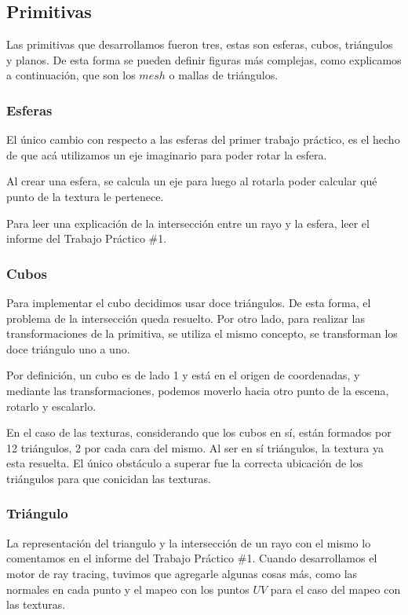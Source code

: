 \documentclass[a4paper,10pt]{article}
\begin{document}
\subsection{Primitivas}

Las primitivas que desarrollamos fueron tres, estas son esferas, cubos,
tri\'angulos y planos.  De esta forma se pueden definir figuras m\'as
complejas, como explicamos a continuaci\'on, que son los $mesh$ o mallas de
tri\'angulos.

\subsubsection{Esferas}

El \'unico cambio con respecto a las esferas del primer trabajo pr\'actico, es
el hecho de que ac\'a utilizamos un eje imaginario para poder rotar la esfera.

Al crear una esfera, se calcula un eje para luego al rotarla poder calcular
qu\'e punto de la textura le pertenece.

Para leer una explicaci\'on de la intersecci\'on entre un rayo y la esfera,
leer el informe del Trabajo Pr\'actico \#1.

\subsubsection{Cubos}

Para implementar el cubo decidimos usar doce tri\'angulos.  De esta forma, el
problema de la intersecci\'on queda resuelto.  Por otro lado, para realizar las
transformaciones de la primitiva, se utiliza el mismo concepto, se transforman
los doce tri\'angulo uno a uno.

Por definici\'on, un cubo es de lado 1 y est\'a en el origen de coordenadas, y
mediante las transformaciones, podemos moverlo hacia otro punto de la escena, 
rotarlo y escalarlo.

En el caso de las texturas, considerando que los cubos en s\'i, est\'an
formados por 12 tri\'angulos, 2 por cada cara del mismo. Al ser en s\'i
tri\'angulos, la textura ya esta resuelta. El \'unico obst\'aculo a superar fue
la correcta ubicaci\'on de los tri\'angulos para que conicidan las texturas.

\subsubsection{Tri\'angulo}
La representaci\'on del triangulo y la intersecci\'on de un rayo con el mismo
lo comentamos en el informe del Trabajo Pr\'actico \#1.  Cuando desarrollamos
el motor de ray tracing, tuvimos que agregarle algunas cosas m\'as, como las
normales en cada punto y el mapeo con los puntos $UV$ para el caso del mapeo
con las texturas.
\end{document}
